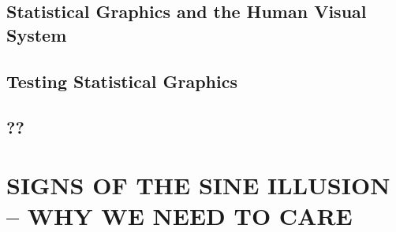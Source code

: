 \documentclass[11pt]{isuthesis}\usepackage[]{graphicx}\usepackage[]{color}
\begin{document}
\section{Statistical Graphics and the Human Visual System}

\section{Testing Statistical Graphics}

\section{??}



\graphicspath{{Figure/sineIllusion/}{Images/sineIllusion/}}
\renewcommand{\floatpagefraction}{.99}

\newcommand{\range}[1]{{\text{range}\left(#1\right)}}
\newcommand{\s}[2]{{_{#1}s^{ #2}}}
\newcommand{\atan}[1]{\text{atan}\left({#1}\right)}
\newcommand{\xR}{\mathbb{R}}

\newcommand{\done}[2][inline]{\todo[color=SpringGreen, #1]{#2}}  %
\newcommand{\meh}[2][inline]{\todo[color=White, #1]{#2}}   %
\newcommand{\comment}[2][inline]{\todo[color=SkyBlue, #1]{#2}} %
\newcommand{\mcomment}[1]{\todo[color=SkyBlue]{#1}} %

\newcommand{\newtext}[1]{\todo[inline, color=White]{ \color{OliveGreen}{#1}}} %
\newcommand{\newdo}[1]{\todo[inline, color=Plum]{#1}} %
\newcommand{\move}[1]{\todo[inline, color=Lime]{#1}} %








\chapter{SIGNS OF THE SINE ILLUSION -- WHY WE NEED TO CARE}
\end{document}
